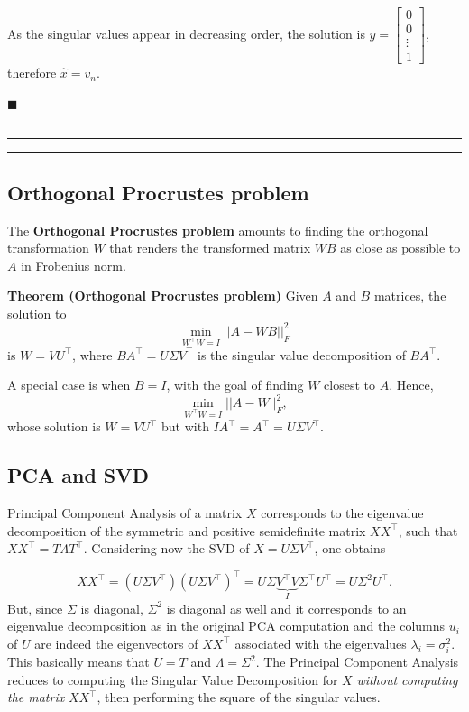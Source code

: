 \documentclass[10pt]{report}
\begin{document}
As the singular values appear in decreasing order, the solution is \(y = \begin{bmatrix}0 \\ 0 \\ \vdots \\ 1\end{bmatrix}\), therefore \(\hat x = v_n\).

\begin{flushright}
$\blacksquare$
\end{flushright}

\vspace*{0.6cm}\hrule
\hrule
\hrule
\vspace*{0.4cm}
\subsection{Orthogonal Procrustes problem}
\label{sec:org7a1a256}

The \textbf{Orthogonal Procrustes problem} amounts to finding the orthogonal transformation \(W\) that renders the transformed matrix \(WB\) as close as possible to \(A\) in Frobenius norm.

\textbf{Theorem (Orthogonal Procrustes problem)} Given \(A\) and \(B\) matrices, the solution to $$\min_{W^\top W=I} ||A - WB||^2_F$$ is \(W=VU^\top\), where \(BA^\top = U\Sigma V^\top\) is the singular value decomposition of \(BA^\top\).

A special case is when \(B = I\), with the goal of finding \(W\) closest to \(A\). Hence,
$$\min_{W^\top W=I} ||A - W||^2_F,$$ whose solution is \(W = VU^\top\) but with \(IA^\top = A^\top = U\Sigma V^\top\).
\subsection{PCA and SVD}
\label{sec:orgd342027}
Principal Component Analysis of a matrix \(X\) corresponds to the eigenvalue decomposition of the symmetric and positive semidefinite matrix \(XX^\top\), such that \(XX^\top = T\Lambda T^\top\). Considering now the SVD of \(X = U\Sigma V^\top\), one obtains

$$XX^\top = \left(U\Sigma V^\top\right)\left(U\Sigma V^\top\right)^\top = U\Sigma \underbrace{V^\top V}_{I} \Sigma^\top U^\top = U\Sigma^2 U^\top.$$ But, since \(\Sigma\) is diagonal, \(\Sigma^2\) is diagonal as well and it corresponds to an eigenvalue decomposition as in the original PCA computation and the columns \(u_i\) of \(U\) are indeed the eigenvectors of \(XX^\top\) associated with the eigenvalues \(\lambda_i =\sigma^2_i\). This basically means that \(U = T\) and \(\Lambda = \Sigma^2\). The Principal Component Analysis reduces to computing the Singular Value Decomposition for \(X\) \emph{without computing the matrix} \(XX^\top\), then performing the square of the singular values.
\end{document}
